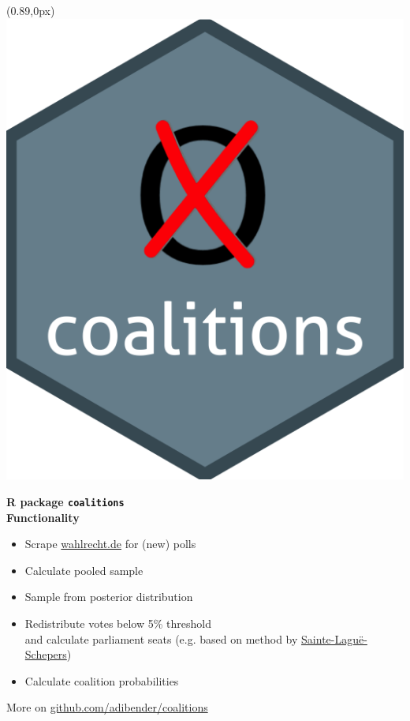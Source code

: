 \documentclass[10pt,xcolor=dvipsnames,t,headinclude,headsepline=1.5cm,usepdftitle=false]{beamer}
\begin{document}
\begin{frame}[fragile]
\begin{textblock*}{1.25cm}(0.89\textwidth,0px)
\includegraphics[width=1\textwidth]{figures/coalitions_hex}
\end{textblock*}
\vspace{10px}
\textbf{R package \texttt{coalitions}}
\\[1cm]
\textbf{Functionality}
\begin{itemize}
  \item Scrape \href{https://www.wahlrecht.de/}{wahlrecht.de} for (new) polls
  \item Calculate pooled sample
  \item Sample from posterior distribution
  \item Redistribute votes below 5\% threshold \\[0.1cm]
and calculate parliament seats 
{\footnotesize (e.g. based on method by \href{http://www.wahlrecht.de/verfahren/rangmasszahlen.html}{Sainte-Lagu\"e-Schepers})}
  \item Calculate coalition probabilities
\end{itemize}
\bigskip
More on \href{https://github.com/adibender/coalitions/}{github.com/adibender/coalitions}
\end{frame}
\end{document}
